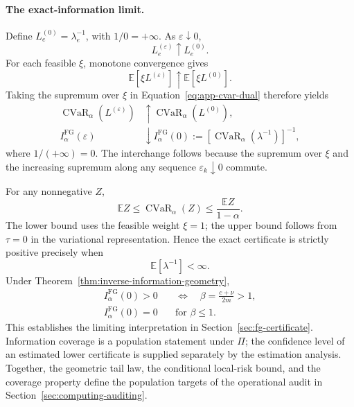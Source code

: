 \paragraph{The exact-information limit.}

Define \(L_e^{(0)}=\lambda_e^{-1}\), with \(1/0=+\infty\). As \(\varepsilon\downarrow0\),
\[
L_e^{(\varepsilon)}\uparrow L_e^{(0)}.
\]
For each feasible \(\xi\), monotone convergence gives
\[
\mathbb E[\xi L^{(\varepsilon)}]
\uparrow
\mathbb E[\xi L^{(0)}].
\]
Taking the supremum over \(\xi\) in Equation~\eqref{eq:app-cvar-dual} therefore yields
\[
\begin{aligned}
\operatorname{CVaR}_{\alpha}(L^{(\varepsilon)})
&\uparrow
\operatorname{CVaR}_{\alpha}(L^{(0)}),
\\
I_\alpha^{\mathrm{FG}}(\varepsilon)
&\downarrow
I_\alpha^{\mathrm{FG}}(0)
:=
\left[
\operatorname{CVaR}_{\alpha}(\lambda^{-1})
\right]^{-1},
\end{aligned}
\tag{A.30}\label{eq:app-exact-limit}
\]
where \(1/(+\infty)=0\). The interchange follows because the supremum over \(\xi\) and the increasing supremum along any sequence \(\varepsilon_k\downarrow0\) commute.

For any nonnegative \(Z\),
\[
\mathbb EZ
\le
\operatorname{CVaR}_{\alpha}(Z)
\le
\frac{\mathbb EZ}{1-\alpha}.
\tag{A.31}\label{eq:app-cvar-mean-bounds}
\]
The lower bound uses the feasible weight \(\xi=1\); the upper bound follows from \(\tau=0\) in the variational representation. Hence the exact certificate is strictly positive precisely when
\[
\mathbb E[\lambda^{-1}]<\infty.
\]
Under Theorem~\ref{thm:inverse-information-geometry},
\[
\begin{aligned}
I_\alpha^{\mathrm{FG}}(0)>0
&\quad\Longleftrightarrow\quad
\beta=\frac{c+\nu}{2m}>1,
\\
I_\alpha^{\mathrm{FG}}(0)=0
&\quad\text{for }\beta\le1.
\end{aligned}
\tag{A.32}\label{eq:app-certificate-integrability}
\]
This establishes the limiting interpretation in Section~\ref{sec:fg-certificate}. Information coverage is a population statement under \(\Pi\); the confidence level of an estimated lower certificate is supplied separately by the estimation analysis. Together, the geometric tail law, the conditional local-risk bound, and the coverage property define the population targets of the operational audit in Section~\ref{sec:computing-auditing}.
